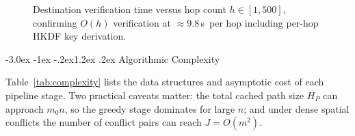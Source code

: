 \documentclass[10pt,a4paper]{article}
\makeatletter
\renewcommand\section{\@startsection{section}{1}{\z@}%
  {-3.0ex \@plus -1ex \@minus -.2ex}{1.2ex \@plus .2ex}%
  {\normalfont\large\bfseries}}
\newcommand\us{\,\textmu s}
\makeatother
\begin{document}
\begin{figure}[t]
\centering
{}
\caption{Destination verification time versus hop count $h\in[1,500]$, confirming $O(h)$ verification at $\approx$9.8\us\ per hop
including per-hop HKDF key derivation.}
\label{fig:hmactime}
\end{figure}

\section{Algorithmic Complexity}\label{sec:complexity}

Table~\ref{tab:complexity} lists the data structures and asymptotic cost of each pipeline stage. Two practical caveats
matter: the total cached path size $H_P$ can approach $m_0n$, so the greedy stage dominates for large $n$; and under dense
spatial conflicts the number of conflict pairs can reach $J=O(m^2)$.
\end{document}
